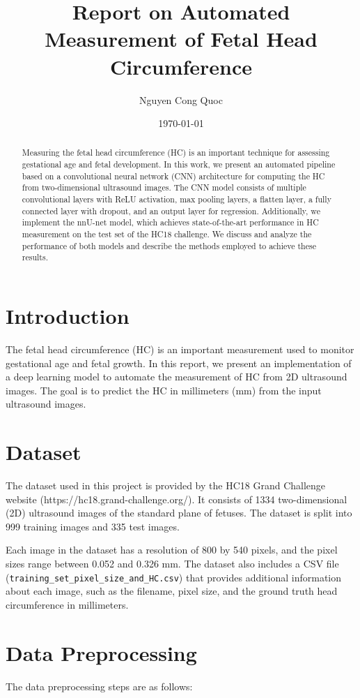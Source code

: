 \documentclass[twocolumn]{article}
\title{Report on Automated Measurement of Fetal Head Circumference}
\author{Nguyen Cong Quoc}
\date{\today}
\begin{document}
\maketitle

\begin{abstract}
Measuring the fetal head circumference (HC) is an important technique for assessing gestational age and fetal development. In this work, we present an automated pipeline based on a convolutional neural network (CNN) architecture for computing the HC from two-dimensional ultrasound images. The CNN model consists of multiple convolutional layers with ReLU activation, max pooling layers, a flatten layer, a fully connected layer with dropout, and an output layer for regression. Additionally, we implement the nnU-net model, which achieves state-of-the-art performance in HC measurement on the test set of the HC18 challenge. We discuss and analyze the performance of both models and describe the methods employed to achieve these results.
\end{abstract}

\section{Introduction}
The fetal head circumference (HC) is an important measurement used to monitor gestational age and fetal growth. In this report, we present an implementation of a deep learning model to automate the measurement of HC from 2D ultrasound images. The goal is to predict the HC in millimeters (mm) from the input ultrasound images.

\section{Dataset}
The dataset used in this project is provided by the HC18 Grand Challenge website (https://hc18.grand-challenge.org/). It consists of 1334 two-dimensional (2D) ultrasound images of the standard plane of fetuses. The dataset is split into 999 training images and 335 test images.

Each image in the dataset has a resolution of 800 by 540 pixels, and the pixel sizes range between 0.052 and 0.326 mm. The dataset also includes a CSV file (\verb|training_set_pixel_size_and_HC.csv|) that provides additional information about each image, such as the filename, pixel size, and the ground truth head circumference in millimeters.

\section{Data Preprocessing}
The data preprocessing steps are as follows:
\end{document}
